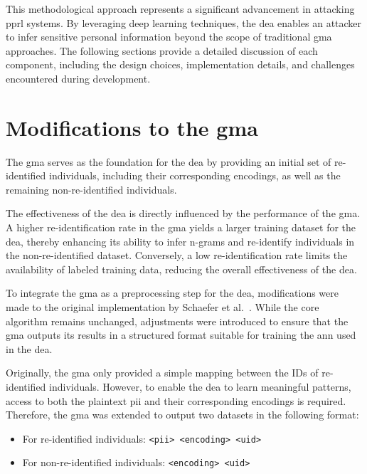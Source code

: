 This methodological approach represents a significant advancement in attacking \ac{pprl} systems.
By leveraging deep learning techniques, the \ac{dea} enables an attacker to infer sensitive personal information beyond the scope of traditional \ac{gma} approaches.
The following sections provide a detailed discussion of each component, including the design choices, implementation details, and challenges encountered during development.

\section{Modifications to the \ac{gma}} \label{sec:modifications}

The \ac{gma} serves as the foundation for the \ac{dea} by providing an initial set of re-identified individuals, including their corresponding encodings, as well as the remaining non-re-identified individuals.

The effectiveness of the \ac{dea} is directly influenced by the performance of the \ac{gma}.
A higher re-identification rate in the \ac{gma} yields a larger training dataset for the \ac{dea}, thereby enhancing its ability to infer n-grams and re-identify individuals in the non-re-identified dataset.
Conversely, a low re-identification rate limits the availability of labeled training data, reducing the overall effectiveness of the \ac{dea}.

To integrate the \ac{gma} as a preprocessing step for the \ac{dea}, modifications were made to the original implementation by Schaefer et al.~\cite{schaefer2024}.
While the core algorithm remains unchanged, adjustments were introduced to ensure that the \ac{gma} outputs its results in a structured format suitable for training the \ac{ann} used in the \ac{dea}.

Originally, the \ac{gma} only provided a simple mapping between the IDs of re-identified individuals.
However, to enable the \ac{dea} to learn meaningful patterns, access to both the plaintext \ac{pii} and their corresponding encodings is required.
Therefore, the \ac{gma} was extended to output two datasets in the following format:

\begin{itemize}
    \item For re-identified individuals: \texttt{<\ac{pii}> <encoding> <uid>}
    \item For non-re-identified individuals: \texttt{<encoding> <uid>}
\end{itemize}

